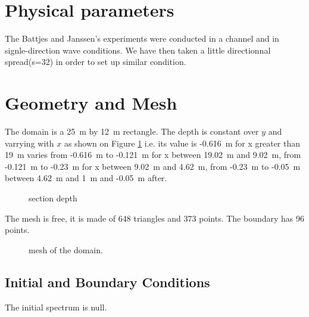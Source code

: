 %
%
%

%
%
\section{Physical parameters}
%
The Battjes and Janssen's experiments were conducted in a channel and in
signle-direction wave conditions. We have then taken a little directionnal
spread(s=32) in order to set up similar condition.

%
%
\section{Geometry and Mesh}
%
The domain is a 25~m by 12~m rectangle. The depth is constant over $y$ and
varrying with $x$ as shown on Figure \ref{bathybj} i.e. its value is -0.616~m for x greater than 19~m varies from -0.616~m to -0.121~m for x between 19.02~m and 9.02~m, from -0.121~m to -0.23~m for x between 9.02~m and 4.62~m, from -0.23~m to -0.05~m between 4.62~m and 1~m and -0.05~m after.    

\begin{figure} [!h]
\centering
{}
 \caption{section depth}
\label{bathybj}
\end{figure}

The mesh is free, it is made of 648 triangles and 373 points. The boundary has
96 points.
%
%

\begin{figure} [!h]
\centering
{}
\caption{mesh of the domain.}
\label{meshbj}
\end{figure}
\subsection{Initial and Boundary Conditions}
The initial spectrum is null.

